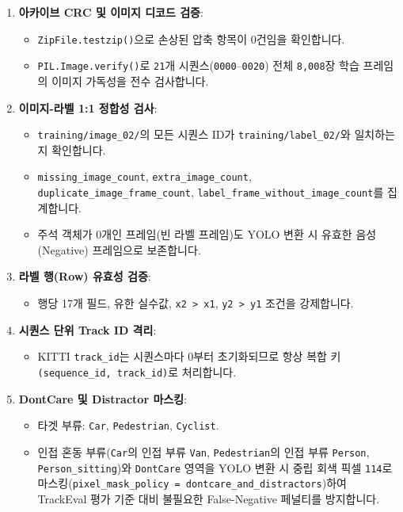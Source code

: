 \documentclass[10.5pt,a4paper]{article}
\begin{document}
\begin{enumerate}[leftmargin=1.8em,itemsep=2pt]
\item \textbf{아카이브 CRC 및 이미지 디코드 검증}:
\begin{itemize}[leftmargin=1.5em,itemsep=2pt]
\item \texttt{ZipFile.\allowbreak{}testzip()}으로 손상된 압축 항목이 0건임을 확인합니다.
\item \texttt{PIL.\allowbreak{}Image.\allowbreak{}verify()}로 \texttt{21}개 시퀀스(\texttt{0000}--\texttt{0020}) 전체 \texttt{8,\allowbreak{}008}장 학습 프레임의 이미지 가독성을 전수 검사합니다.
\end{itemize}
\item \textbf{이미지-라벨 1:1 정합성 검사}:
\begin{itemize}[leftmargin=1.5em,itemsep=2pt]
\item \texttt{training/\allowbreak{}image\_\allowbreak{}02/\allowbreak{}}의 모든 시퀀스 ID가 \texttt{training/\allowbreak{}label\_\allowbreak{}02/\allowbreak{}}와 일치하는지 확인합니다.
\item \texttt{missing\_\allowbreak{}image\_\allowbreak{}count}, \texttt{extra\_\allowbreak{}image\_\allowbreak{}count}, \texttt{duplicate\_\allowbreak{}image\_\allowbreak{}frame\_\allowbreak{}count}, \texttt{label\_\allowbreak{}frame\_\allowbreak{}without\_\allowbreak{}image\_\allowbreak{}count}를 집계합니다.
\item 주석 객체가 0개인 프레임(빈 라벨 프레임)도 YOLO 변환 시 유효한 음성(Negative) 프레임으로 보존합니다.
\end{itemize}
\item \textbf{라벨 행(Row) 유효성 검증}:
\begin{itemize}[leftmargin=1.5em,itemsep=2pt]
\item 행당 17개 필드, 유한 실수값, \texttt{x2 > x1}, \texttt{y2 > y1} 조건을 강제합니다.
\end{itemize}
\item \textbf{시퀀스 단위 Track ID 격리}:
\begin{itemize}[leftmargin=1.5em,itemsep=2pt]
\item KITTI \texttt{track\_\allowbreak{}id}는 시퀀스마다 0부터 초기화되므로 항상 복합 키 \texttt{(sequence\_\allowbreak{}id,\allowbreak{} track\_\allowbreak{}id)}로 처리합니다.
\end{itemize}
\item \textbf{DontCare 및 Distractor 마스킹}:
\begin{itemize}[leftmargin=1.5em,itemsep=2pt]
\item 타겟 부류: \texttt{Car}, \texttt{Pedestrian}, \texttt{Cyclist}.
\item 인접 혼동 부류(\texttt{Car}의 인접 부류 \texttt{Van}, \texttt{Pedestrian}의 인접 부류 \texttt{Person}, \texttt{Person\_\allowbreak{}sitting})와 \texttt{DontCare} 영역을 YOLO 변환 시 중립 회색 픽셀 \texttt{114}로 마스킹(\texttt{pixel\_\allowbreak{}mask\_\allowbreak{}policy = dontcare\_\allowbreak{}and\_\allowbreak{}distractors})하여 TrackEval 평가 기준 대비 불필요한 False-Negative 페널티를 방지합니다.
\end{itemize}
\end{enumerate}
\end{document}
